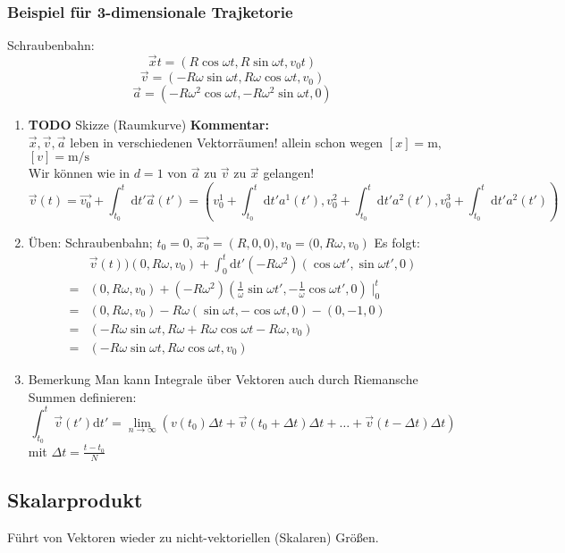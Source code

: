 \documentclass[11pt]{article}
\begin{document}
\subsubsection{Beispiel für 3-dimensionale Trajketorie}
\label{sec-1-5-1}
Schraubenbahn:
\[\vec{x}t = (R\cos{\omega t},R\sin{\omega t}, v_0 t)\]
\[\vec{v} = (-R\omega\sin{\omega t}, R\omega\cos{\omega t}, v_0)\]
\[\vec{a} = (-R\omega^2\cos{\omega t}, -R\omega^2\sin{\omega t}, 0)\]
\begin{enumerate}
\item {\bfseries\sffamily TODO} Skizze (Raumkurve)
\label{sec-1-5-1-1}
\textbf{Kommentar:} \\
     $\vec{x},\vec{v},\vec{a}$ leben in verschiedenen Vektorräumen!
allein schon wegen $[x] = \si{\meter}$, $[v] = \si{\meter\per\second}$ \\
     Wir können wie in $d=1$ von $\vec{a}$ zu $\vec{v}$ zu $\vec{x}$ gelangen!
\[\vec{v}(t) = \vec{v_0} + \int_{t_0}^{t} \mathrm{d}t' \vec{a}(t') = (v_0^1 + \int_{t_0}^t \mathrm{d}t' a^1(t'), v_0^2 + \int_{t_0}^t \mathrm{d}t' a^2(t'), v_0^3 + \int_{t_0}^t \mathrm{d}t' a^2(t'))\]
\item Üben:
\label{sec-1-5-1-2}
Schraubenbahn; $t_0 = 0$, $\vec{x_0} = \left(R, 0, 0), v_0 = (0, R\omega, v_0\right)$
Es folgt:
\begin{align}
&\vec{v}(t) ) (0, R\omega, v_0) + \int_0^t \mathrm{d}t' ( -R\omega^2)(\cos{\omega t', \sin{\omega t'}, 0})\\
=& (0, R\omega, v_0) + (-R\omega^2)(\frac{1}{\omega}\sin{\omega t'}, -\frac{1}{\omega}\cos{\omega t'}, 0)\mid_0^t\\
=& (0, R\omega, v_0) - R\omega (\sin{\omega t}, -\cos{\omega t}, 0) - (0, -1, 0)\\
=& (-R\omega\sin{\omega t}, R\omega + R\omega\cos{\omega t} - R\omega, v_0)\\
=& (-R\omega\sin{\omega t}, R\omega\cos{\omega t}, v_0)
\end{align}
\item Bemerkung
\label{sec-1-5-1-3}
Man kann Integrale über Vektoren auch durch Riemansche Summen definieren:
\[\int_{t_0}^t \vec{v}(t')\mathrm{d}t' = \lim_{n\to\infty} (v(t_0)\Delta t + \vec{v}(t_0 + \Delta t)\Delta t + \ldots + \vec{v}(t - \Delta t)\Delta t)\]
mit $\Delta t = \frac{t - t_0}{N}$
\end{enumerate}
\subsection{Skalarprodukt}
\label{sec-1-6}
Führt von Vektoren wieder zu nicht-vektoriellen (Skalaren) Größen.
\end{document}
